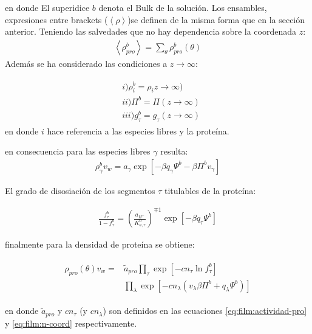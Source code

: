 \noindent en donde El superidice $b$ denota el Bulk de la soluci\'on. 
 Los ensambles, expresiones entre brackets ($\left<\rho\right>$)se definen de la misma forma que en la secci\'on anterior. Teniendo las salvedades que no hay dependencia sobre la coordenada $z$:
 \begin{align}
 	\left<\rho^b_{pro}\right> = \sum_{\theta}\rho^b_{pro}(\theta)
 \end{align}
 Adem\'as se ha considerado las condiciones a $z \to \infty$:

\begin{align}
	\begin{aligned}
		& i)\rho^b_i =\rho_iz \rightarrow \infty)   \\
		& ii)  \Pi^b = \Pi(z \rightarrow \infty) \\
		& iii) g_\tau^b = g_\tau(z \rightarrow \infty)  
	\end{aligned}
\end{align}
\noindent en donde $i$ hace referencia a las especies libres y la prote\'ina. 

en consecuencia para las especies libres $\gamma$ resulta:
\begin{align}
	\rho^b_\gamma v_w = a_\gamma \exp\left[ -\beta q_\gamma \Psi^b -\beta \Pi^b v_\gamma \right]
	\label{eq:film:rhofree-bulk}
\end{align}

El grado de disosiaci\'on de los segmentos $\tau$ titulables de la prote\'ina:

\begin{align}
		\frac{f^b_\tau}{1-f^b_\tau} = \left(\frac{a_{H^+}}{K^0_{a,\tau}}\right)^{\mp 1} \exp[-\beta q_\tau \Psi^b]
\end{align}


finalmente para la densidad de prote\'ina se obtiene:

\begin{align}
	\begin{aligned}
		\rho_{pro}(\theta)v_w = &\tilde{a}_{pro} \prod_\tau \exp\left[-cn_\tau \ln f^b_\tau\right] \\
		& \prod_\lambda \exp \left[-cn_\lambda (v_\lambda\beta\Pi^b + q_\lambda \Psi^b) \right]
	\end{aligned}
	\label{eq:film:rhopro-bulk}
\end{align}

\noindent en donde $\tilde{a}_{pro}$ y $cn_\tau$ (y $cn_\lambda$) son definidos en las ecuaciones  \ref{eq:film:actividad-pro} y \ref{eq:film:n-coord} respectivamente. 

